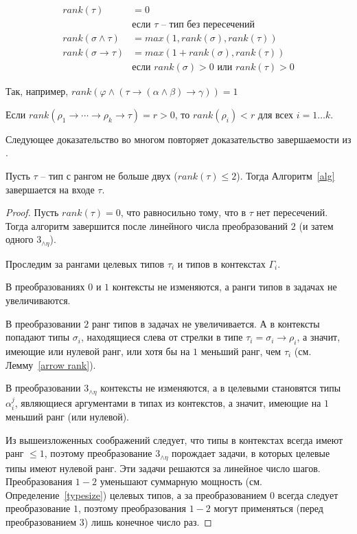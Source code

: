 \documentclass[../main.tex]{subfiles}
\begin{document}
\begin{definition}

\begin{align*}
    rank(\tau) &= 0 \\
               & \text{если $\tau$ -- тип без пересечений}\\
    rank(\sigma \wedge \tau) &= max(1, rank(\sigma), rank(\tau))\\
    rank(\sigma \to \tau) &= max(1 + rank(\sigma), rank(\tau))\\
               & \text{если $rank(\sigma) > 0$ или $rank(\tau) > 0$}
\end{align*}

\end{definition}

Так, например, $rank(\varphi \wedge (\tau \to (\alpha \wedge \beta) \to \gamma)) = 1$

\begin{lemma}\label{arrow rank}
Если $rank(\rho_1 \to \cdots \to \rho_k \to \tau) = r > 0$, то $rank(\rho_i) < r$ для всех $i = 1 \dots k$.
\end{lemma}

Следующее доказательство во многом повторяет доказательство завершаемости из \cite{kusmierek_2007}.
\begin{theorem}[Termination] \label{termination}
Пусть $\tau$ -- тип с рангом не больше двух ($rank(\tau) \leqslant 2$). Тогда Алгоритм~\ref{alg} завершается на входе $\tau$.
\end{theorem}
\begin{proof}
    Пусть $rank(\tau) = 0$, что равносильно тому, что в $\tau$ нет пересечений. Тогда алгоритм завершится после линейного числа преобразований $2$ (и затем одного $3_{\wedge \eta}$).
    
    Проследим за рангами целевых типов $\tau_i$ и типов в контекстах $\Gamma_i$.
    
    В преобразованиях $0$ и $1$ контексты не изменяются, а ранги типов в задачах не увеличиваются.
    
    В преобразовании $2$ ранг типов в задачах не увеличивается. А в контексты попадают 
    типы $\sigma_i$, находящиеся слева от стрелки в типе $\tau_i = \sigma_i \to \rho_i$, а значит, имеющие или нулевой ранг, или хотя бы на $1$ меньший ранг, чем $\tau_i$ (см. Лемму~\ref{arrow rank}). 
    
    В преобразовании $3_{\wedge \eta}$ контексты не изменяются, а в целевыми становятся типы $\alpha_i^j$, являющиеся аргументами в типах из контекстов, а значит, имеющие на $1$ меньший ранг (или нулевой).
    
    Из вышеизложенных соображений следует, что типы в контекстах всегда имеют ранг $\leqslant 1$, поэтому преобразование $3_{\wedge \eta}$ порождает задачи, в которых целевые типы имеют нулевой ранг. Эти задачи решаются за линейное число шагов. 
    Преобразования $1-2$ уменьшают суммарную мощность (см. Определение~\ref{typesize}) целевых типов, а за преобразованием $0$ всегда следует преобразование $1$, поэтому преобразования $1-2$ могут применяться (перед преобразованием $3$) лишь конечное число раз.
    
    
\end{proof}
\end{document}
